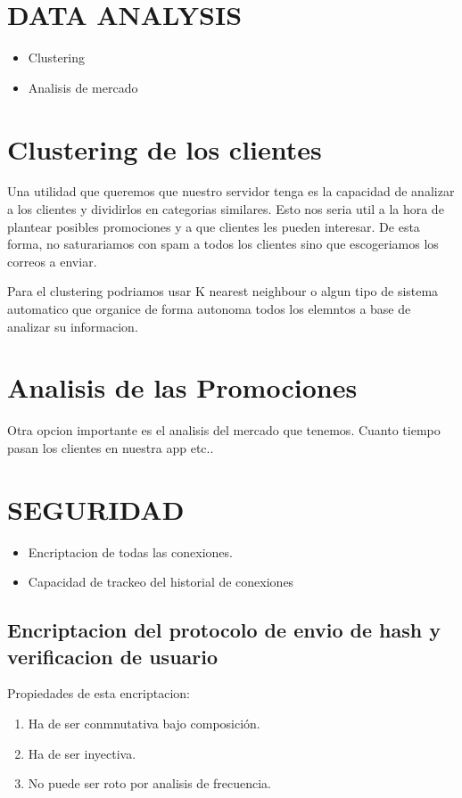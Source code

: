 \documentclass{article}
\theoremstyle{definition}
\begin{document}
\section{DATA ANALYSIS}

\begin{itemize}
    \item Clustering
    \item Analisis de mercado
\end{itemize}

\section{Clustering de los clientes}

Una utilidad que queremos que nuestro servidor tenga es la capacidad de analizar a los clientes y dividirlos en categorias similares. Esto nos seria util a la hora de plantear posibles promociones y a que clientes les pueden interesar. De esta forma, no saturariamos con spam a todos los clientes sino que escogeriamos los correos a enviar. 

Para el clustering podriamos usar K nearest neighbour o algun tipo de sistema automatico que organice de forma autonoma todos los elemntos a base de analizar su informacion.

\section{Analisis de las Promociones}

Otra opcion importante es el analisis del mercado que tenemos. Cuanto tiempo pasan los clientes en nuestra app etc..

\section{SEGURIDAD}

\begin{itemize}
    \item Encriptacion de todas las conexiones.
    \item Capacidad de trackeo del historial de conexiones
\end{itemize}

\subsection{Encriptacion del protocolo de envio de hash y verificacion de usuario}

Propiedades de esta encriptacion:
\begin{enumerate}
\item Ha de ser conmnutativa bajo composición.
\item Ha de ser inyectiva.
\item No puede ser roto por analisis de frecuencia.
\end{enumerate}
\end{document}
